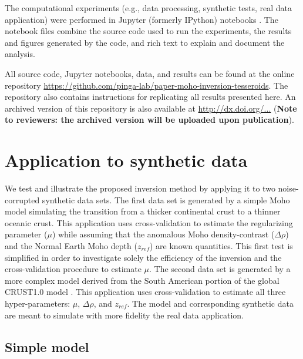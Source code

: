 The computational experiments
(e.g., data processing, synthetic tests, real data application)
were performed in
Jupyter (formerly IPython) notebooks
\citep[][ \url{http://jupyter.org/}]{perez2007}.
The notebook files combine the source code used to run the experiments,
the results and figures generated by the code,
and rich text to explain and document the analysis.

All source code, Jupyter notebooks, data, and results
can be found at the online repository
\url{https://github.com/pinga-lab/paper-moho-inversion-tesseroids}.
The repository also contains instructions for replicating all results presented
here.
An archived version of this repository is also available at
\url{http://dx.doi.org/...}
(\textbf{Note to reviewers: the archived version will be uploaded upon
publication}).


\section{Application to synthetic data}

We test and illustrate the proposed inversion method
by applying it to two noise-corrupted synthetic data sets.
The first data set is generated by a simple Moho model simulating the transition
from a thicker continental crust to a thinner oceanic crust.
This application uses cross-validation to estimate the regularizing parameter
($\mu$) while assuming that the anomalous Moho density-contrast ($\Delta\rho$)
and the Normal Earth Moho depth ($z_{ref}$) are known quantities.
This first test is simplified in order to investigate solely
the efficiency of the inversion and
the cross-validation procedure to estimate $\mu$.
The second data set is generated by a more complex model derived from
the South American portion of the global CRUST1.0 model \citep{laske2013}.
This application uses cross-validation to estimate all three hyper-parameters:
$\mu$, $\Delta\rho$, and $z_{ref}$.
The model and corresponding synthetic data are meant to simulate
with more fidelity the real data application.


\subsection{Simple model}\label{sec:p3-simple-synthetic}


